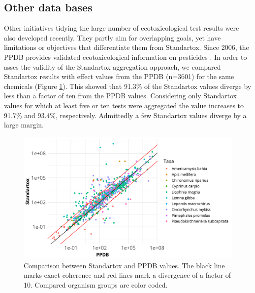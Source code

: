 \subsection*{Other data bases}
Other initiatives tidying the large number of ecotoxicological test results were also developed recently. They partly aim for overlapping goals, yet have limitations or objectives that differentiate them from Standartox. Since 2006, the PPDB provides validated ecotoxicological information on pesticides \citep{lewis_international_2016}. In order to asses the validity of the Standartox aggregation approach, we compared Standartox results with effect values from the PPDB (n=3601) for the same chemicals (Figure \ref{fig:standartox_ppdb_diff}). This showed that 91.3\% of the Standartox values diverge by less than a factor of ten from the PPDB values. Considering only Standartox values for which at least five or ten tests were aggregated the value increases to 91.7\% and 93.4\%, respectively. Admittedly a few Standartox values diverge by a large margin.

\begin{figure}
    \includegraphics[width=1\linewidth]{article/figures/gg_ppdb_stan_compare_continous.png}
    \caption{Comparison between Standartox and PPDB values. The black line marks exact coherence and red lines mark a divergence of a factor of 10. Compared organism groups are color coded.}
    \label{fig:standartox_ppdb_diff}
\end{figure}

